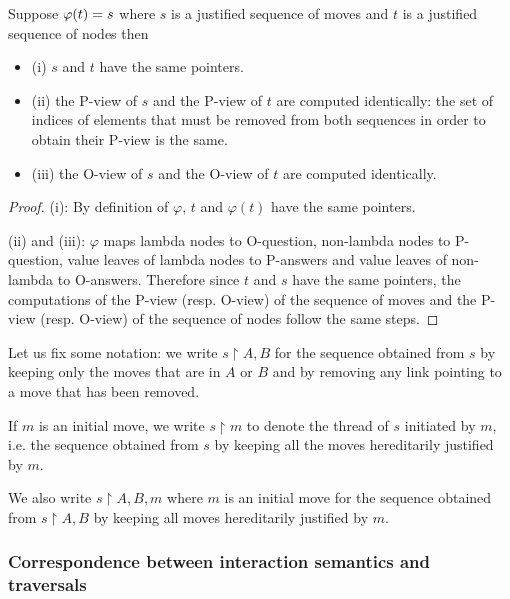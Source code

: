 \begin{property}
\label{proper:phi_pview} Suppose $\varphi(t) = s$ where $s$ is a
justified sequence of moves and $t$ is a justified sequence of nodes
then
\begin{itemize}
\item (i) $s$ and $t$ have the same pointers.
\item (ii) the P-view of $s$ and the P-view of $t$ are computed
identically: the set of indices of elements that must be removed
from both sequences in order to obtain their P-view is the same.
\item (iii) the O-view of $s$ and the O-view of $t$ are computed identically.
\end{itemize}
\end{property}
\begin{proof}
(i): By definition of $\varphi$, $t$ and $\varphi(t)$ have the same
pointers.

(ii) and (iii): $\varphi$ maps lambda nodes to O-question,
non-lambda nodes to P-question, value leaves of lambda nodes to P-answers and
value leaves of non-lambda to O-answers. Therefore since $t$ and $s$ have the
same pointers, the computations of the P-view (resp. O-view) of the
sequence of moves and the P-view (resp. O-view) of the sequence of
nodes follow the same steps.
\end{proof}


Let us fix some notation: we write $s\upharpoonright A,B$ for the
sequence obtained from $s$ by keeping only the moves that are in $A$ or $B$ and by removing any link pointing to a move that
has been removed.

If $m$ is an initial move, we write $s \upharpoonright m$ to
denote the thread of $s$ initiated by $m$, i.e. the sequence obtained from $s$ by keeping all the moves
hereditarily justified by $m$.

We also write $s \upharpoonright A,B,m$ where $m$ is an initial move
for the sequence obtained from $s \upharpoonright A,B$ by keeping
all moves hereditarily justified by $m$.




\subsubsection{Correspondence between interaction semantics and traversals}





